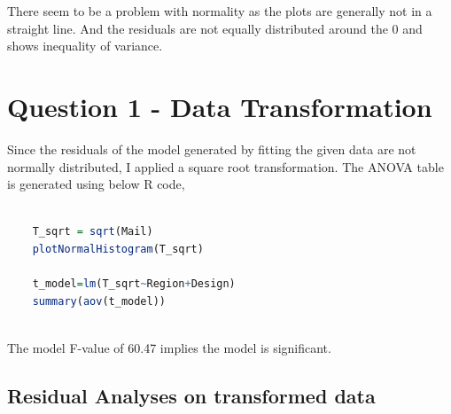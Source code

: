 \documentclass[11pt]{article}
\begin{document}
There seem to be a problem with normality as the plots are generally not in a straight line.
And the residuals are not equally distributed around the 0 and shows inequality of variance.

\section{Question 1 - Data Transformation}
Since the residuals of the model generated by fitting the given data are not normally distributed,
I applied a square root transformation. The ANOVA table is generated using below R code,

\begin{lstlisting}[language=R]
    
    T_sqrt = sqrt(Mail)
    plotNormalHistogram(T_sqrt)

    t_model=lm(T_sqrt~Region+Design)
    summary(aov(t_model))
  
\end{lstlisting}



The model F-value of 60.47 implies the model is significant.


\subsection{Residual Analyses on transformed data}
\end{document}
